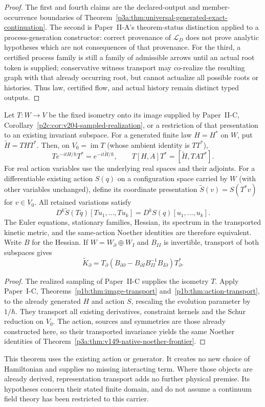 \documentclass[12pt,a4paper]{article}
\begin{document}
\begin{proof}
The first and fourth claims are the declared-output and member-occurrence
boundaries of
Theorem~\ref{p3a:thm:universal-generated-exact-continuation}.  The second is
Paper~II-A's theorem-status distinction applied to a process-generation
constructor: correct provenance of \(\mathscr L_D\) does not prove analytic
hypotheses which are not consequences of that provenance.  For the third,
a certified process family is still a family of admissible arrows until an
actual root token is supplied; conservative witness transport may co-realize
the resulting graph with that already occurring root, but cannot actualize
all possible roots or histories.  Thus law, certified flow, and actual history
remain distinct typed outputs.
\end{proof}


\begin{theorem}
\label{p3a:thm:v204-action-law-transport}
Let $T:W\to V$ be the fixed isometry onto its image supplied by
Paper~II-C, Corollary~\ref{p2c:cor:v204-sampled-realization}, or a
restriction of that presentation to an existing invariant subspace.
For a generated finite law $H=H^*$ on $W$, put $\widetilde H=THT^*$.
Then, on $V_0=\operatorname{im}T$ (whose ambient identity is $TT^*$),
\[
 T e^{-itH/\hbar}T^*=e^{-it\widetilde H/\hbar},\qquad
 T[H,A]T^*=[\widetilde H,TAT^*].
\]
For real action variables use the underlying real spaces and their adjoints.
For a differentiable existing action $S(q)$ on a configuration space carried
by $W$ (with other variables unchanged), define its coordinate presentation
$\widetilde S(v)=S(T^*v)$ for $v\in V_0$. All retained variations satisfy
\[
 D^k\widetilde S(Tq)[Tu_1,\ldots,Tu_k]=D^kS(q)[u_1,\ldots,u_k].
\]
The Euler equations, stationary families, Hessian, its spectrum in the
transported kinetic metric, and the same-action Noether identities are
therefore equivalent. Write $B$ for the Hessian. If $W=W_\partial\oplus W_I$ and
$B_{II}$ is invertible, transport of both subspaces gives
\[
 \widetilde K_\partial=T_\partial
 (B_{\partial\partial}-B_{\partial I}B_{II}^{-1}B_{I\partial})T_\partial^*.
\]
\end{theorem}
\begin{proof}
The realized sampling of Paper~II-C supplies the isometry $T$.
Apply Paper~I-C, Theorems~\ref{p1b:thm:image-transport}
and~\ref{p1b:thm:action-transport}, to the already generated $H$ and
action $S$, rescaling the evolution parameter by $1/\hbar$. They
transport all existing derivatives, constraint kernels and the Schur
reduction on $V_0$. The action, sources and symmetries are those already
constructed here, so their transported invariance yields the same
Noether identities of Theorem~\ref{p3a:thm:v149-native-noether-frontier}.
\end{proof}
This theorem uses the existing action or generator. It creates no new choice
of Hamiltonian and supplies no missing interacting term. Where those objects
are already derived, representation transport adds no further physical
premise. Its hypotheses concern their stated finite domain, and do not
assume a continuum field theory has been restricted to this carrier.
\end{document}
